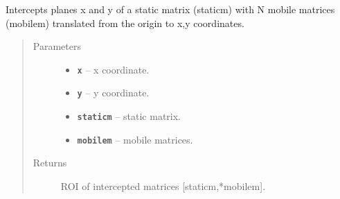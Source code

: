 \documentclass[letterpaper,10pt,english]{sphinxmanual}
\begin{document}
\begin{fulllineitems}
\label{RRtoolbox.lib.arrayops:RRtoolbox.lib.arrayops.basic.matrixIntercept}
Intercepts planes x and y of a static matrix (staticm) with N mobile matrices (mobilem)
translated from the origin to x,y coordinates.
\begin{quote}\begin{description}
\item[{Parameters}] \leavevmode\begin{itemize}
\item {} 
\textbf{\texttt{x}} -- x coordinate.

\item {} 
\textbf{\texttt{y}} -- y coordinate.

\item {} 
\textbf{\texttt{staticm}} -- static matrix.

\item {} 
\textbf{\texttt{mobilem}} -- mobile matrices.

\end{itemize}

\item[{Returns}] \leavevmode
ROI of intercepted matrices {[}staticm,*mobilem{]}.

\end{description}\end{quote}

\end{fulllineitems}

\end{document}
